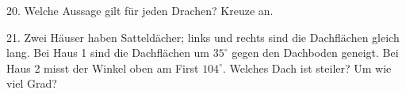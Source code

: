 \documentclass[11pt]{article}
\begin{document}
\begin{pfaufg}{}{20.}{}
Welche Aussage gilt für jeden Drachen? Kreuze an.
\end{pfaufg}

\begin{pfaufg}{}{21.}{}
Zwei Häuser haben Satteldächer; links und rechts sind die Dachflächen gleich lang. Bei Haus 1 sind die Dachflächen um $35^\circ$ gegen den Dachboden geneigt. Bei Haus 2 misst der Winkel oben am First $104^\circ$. Welches Dach ist steiler? Um wie viel Grad?
\end{pfaufg}

\par\vfill{}
\end{document}
